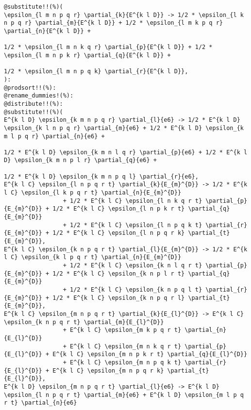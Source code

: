\documentclass[11pt]{article}
\begin{document}
{\color[named]{Blue}\begin{verbatim}
@substitute!!(%)(
\epsilon_{l m n p q r} \partial_{k}{E^{k l D}} -> 1/2 * \epsilon_{l k n p q r} \partial_{m}{E^{k l D}} + 1/2 * \epsilon_{l m k p q r} \partial_{n}{E^{k l D}} + 
                                                                               1/2 * \epsilon_{l m n k q r} \partial_{p}{E^{k l D}} + 1/2 * \epsilon_{l m n p k r} \partial_{q}{E^{k l D}} +
                                                                               1/2 * \epsilon_{l m n p q k} \partial_{r}{E^{k l D}},
):
@prodsort!!(%):
@rename_dummies!(%):
@distribute!!(%):
@substitute!!(%)(
E^{k l D} \epsilon_{k m n p q r} \partial_{l}{e6} -> 1/2 * E^{k l D} \epsilon_{k l n p q r} \partial_{m}{e6} + 1/2 * E^{k l D} \epsilon_{k m l p q r} \partial_{n}{e6} + 
                                                                               1/2 * E^{k l D} \epsilon_{k m n l q r} \partial_{p}{e6} + 1/2 * E^{k l D} \epsilon_{k m n p l r} \partial_{q}{e6} +
                                                                               1/2 * E^{k l D} \epsilon_{k m n p q l} \partial_{r}{e6},
E^{k l C} \epsilon_{l n p q r t} \partial_{k}{E_{m}^{D}} -> 1/2 * E^{k l C} \epsilon_{l k p q r t} \partial_{n}{E_{m}^{D}} 
                 + 1/2 * E^{k l C} \epsilon_{l n k q r t} \partial_{p}{E_{m}^{D}} + 1/2 * E^{k l C} \epsilon_{l n p k r t} \partial_{q}{E_{m}^{D}}
                 + 1/2 * E^{k l C} \epsilon_{l n p q k t} \partial_{r}{E_{m}^{D}} + 1/2 * E^{k l C} \epsilon_{l n p q r k} \partial_{t}{E_{m}^{D}},
E^{k l C} \epsilon_{k n p q r t} \partial_{l}{E_{m}^{D}} -> 1/2 * E^{k l C} \epsilon_{k l p q r t} \partial_{n}{E_{m}^{D}} 
                 + 1/2 * E^{k l C} \epsilon_{k n l q r t} \partial_{p}{E_{m}^{D}} + 1/2 * E^{k l C} \epsilon_{k n p l r t} \partial_{q}{E_{m}^{D}}
                 + 1/2 * E^{k l C} \epsilon_{k n p q l t} \partial_{r}{E_{m}^{D}} + 1/2 * E^{k l C} \epsilon_{k n p q r l} \partial_{t}{E_{m}^{D}},
E^{k l C} \epsilon_{m n p q r t} \partial_{k}{E_{l}^{D}} -> E^{k l C} \epsilon_{k n p q r t} \partial_{m}{E_{l}^{D}} 
                 + E^{k l C} \epsilon_{m k p q r t} \partial_{n}{E_{l}^{D}}
                 + E^{k l C} \epsilon_{m n k q r t} \partial_{p}{E_{l}^{D}} + E^{k l C} \epsilon_{m n p k r t} \partial_{q}{E_{l}^{D}}
                 + E^{k l C} \epsilon_{m n p q k t} \partial_{r}{E_{l}^{D}} + E^{k l C} \epsilon_{m n p q r k} \partial_{t}{E_{l}^{D}},
E^{k l D} \epsilon_{m n p q r t} \partial_{l}{e6} -> E^{k l D} \epsilon_{l n p q r t} \partial_{m}{e6} + E^{k l D} \epsilon_{m l p q r t} \partial_{n}{e6}

\end{verbatim}}
\end{document}
